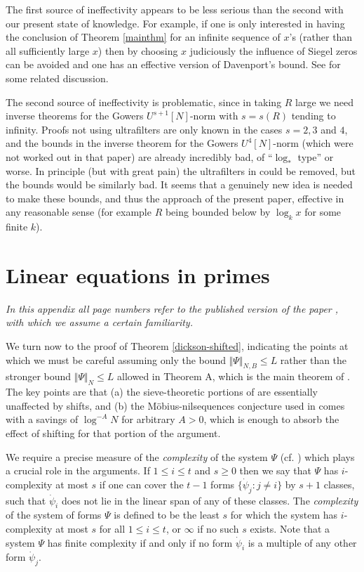 \documentclass[12pt]{amsart}
\numberwithin{equation}{section}  %
\theoremstyle{remark}
\theoremstyle{plain}
\numberwithin{equation}{section}
\renewcommand{\leq}{\leqslant}
\renewcommand{\geq}{\geqslant}
\renewcommand{\(}{\left(}
\renewcommand{\)}{\right)}
\begin{document}
The first source of ineffectivity appears to be less serious than the second with our present state of knowledge. For example, if one is only interested in having the conclusion of Theorem \ref{mainthm} for an infinite sequence of $x$'s (rather than all sufficiently large $x$) then by choosing $x$ judiciously the influence of Siegel zeros can be avoided and one has an effective version of Davenport's bound.  See \cite{Da} for some related discussion.

The second source of ineffectivity is problematic, since in taking $R$ large we need inverse theorems for the Gowers $U^{s+1}[N]$-norm with $s = s(R)$ tending to infinity. Proofs not using ultrafilters are only known in the cases $s = 2,3$ and $4$, and the bounds in the inverse theorem \cite{GTZ-4} for the Gowers $U^{4}[N]$-norm (which were not worked out in that paper) are already incredibly bad, of ``$\log_*$ type'' or worse. In principle (but with great pain) the ultrafilters in \cite{GTZ} could be removed, but the bounds would be similarly bad. It seems that a genuinely new idea is needed to make these bounds, and thus the approach of the present paper, effective in any reasonable sense (for example $R$ being bounded below by $\log_k x$ for some finite $k$).


\appendix

\section{Linear equations in primes}\label{linear-primes-app}

\emph{In this appendix all page numbers refer to the published version of the paper \cite{gt-linearprimes}, with which we assume a certain familiarity.}

We turn now to the proof of Theorem \ref{dickson-shifted}, indicating the points at which we must be careful assuming only the bound $\Vert \Psi \Vert_{N, B} \leq L$ rather than the stronger bound $\Vert \Psi \Vert_{N} \leq L$ allowed in Theorem A, which is the main theorem of \cite{gt-linearprimes}.  The key points are that (a) the sieve-theoretic portions of \cite{gt-linearprimes} are essentially unaffected by shifts, and (b) the M\"obius-nilsequences conjecture used in \cite{gt-linearprimes} comes with a savings of $\log^{-A} N$ for arbitrary $A > 0$, which is enough to absorb the effect of shifting for that portion of the argument.

We require a precise measure of the \emph{complexity} of the system
 $\Psi$ (cf. \cite[Definition 1.5]{gt-linearprimes}) which plays a crucial role in the arguments.  If $1 \leq i \leq t$ and $s \geq 0$ then we say that $\Psi$ has $i$-complexity at most $s$ if one can cover the $t-1$ forms $\{\dot\psi_j : j \ne i \}$ by $s + 1$ classes, such that $\dot\psi_i$ does not lie in the linear span of any of these classes. The \emph{complexity} of the system of forms $\Psi$ is defined to be the least $s$ for which the system has $i$-complexity at most $s$ for all $1 \leq i \leq t$, or $\infty$ if no such $s$ exists.  Note that a system $\Psi$ has finite complexity if and only if no form $\dot\psi_i$ is a multiple of any other form $\dot\psi_j$. 
\end{document}
